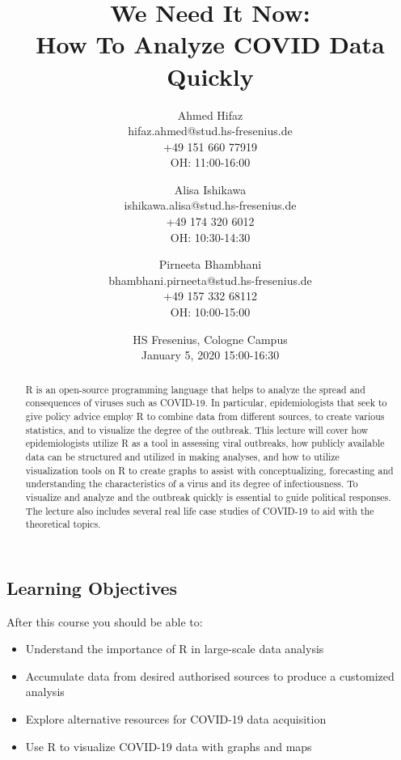\documentclass{article}
\title{We Need It Now: \\
How To Analyze COVID Data Quickly}\\
\author{Ahmed Hifaz \\
	\small hifaz.ahmed@stud.hs-fresenius.de \\
	\small +49 151 660 77919 \\
	\small OH: 11:00-16:00 \\
	\and 
	Alisa Ishikawa \\
	\small ishikawa.alisa@stud.hs-fresenius.de \\
	\small +49 174 320 6012 \\
	\small OH: 10:30-14:30 \\
	\and 
	Pirneeta Bhambhani \\
	\small bhambhani.pirneeta@stud.hs-fresenius.de \\
	\small +49 157 332 68112 \\
	\small OH: 10:00-15:00 \\
}
\date{HS Fresenius, Cologne Campus \\
        January 5, 2020 15:00-16:30}
\begin{document}
	\maketitle
	
\begin{abstract}
\noindent
R is an open-source programming language that helps to analyze the spread and  consequences of viruses such as COVID-19. In particular, epidemiologists that seek to give policy advice employ R to combine data from different sources, to create various statistics, and to visualize the degree of the outbreak. This lecture will cover how epidemiologists utilize R as a tool in assessing viral outbreaks, how publicly available data can be structured and utilized in making analyses, and how to utilize visualization tools on R to create graphs to assist with conceptualizing, forecasting and understanding the characteristics of a virus and its degree of infectiousness. To visualize and analyze and the outbreak quickly is essential to guide political responses. The lecture also includes several real life case studies of COVID-19 to aid with the theoretical topics.
\end{abstract}
\subsection*{Learning Objectives}
	After this course you should be able to:\label{book}
\begin{itemize}
	\item Understand the importance of R in large-scale data analysis
    \item Accumulate data from desired authorised sources to produce a customized analysis
    \item Explore alternative resources for COVID-19 data acquisition
    \item Use R to visualize COVID-19 data with graphs and maps
\end{itemize}
\end{document}
